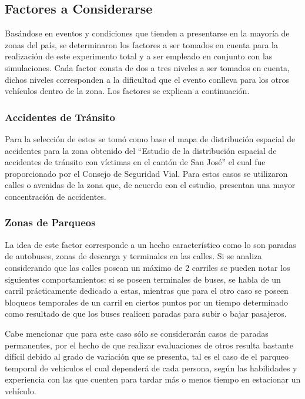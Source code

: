 \documentclass[12pt,journal,compsoc]{IEEEtran}
\begin{document}
\subsection{Factores a Considerarse}
Bas\'{a}ndose en eventos y condiciones que tienden a presentarse en la mayor\'{i}a de zonas del pa\'{i}s, se determinaron los factores a ser tomados en cuenta para la realizaci\'{o}n de este experimento total y a ser empleado en conjunto con las simulaciones. Cada factor consta de dos a tres niveles a ser tomados en cuenta, dichos niveles corresponden a la dificultad que el evento conlleva para los otros veh\'{i}culos dentro de la zona. Los factores se explican a continuaci\'{o}n.

\subsubsection{Accidentes de Tr\'{a}nsito}
Para la selecci\'{o}n de estos se tom\'{o} como base el mapa de distribuci\'{o}n espacial de accidentes para la zona obtenido del “Estudio de la distribuci\'{o}n espacial de accidentes de tr\'{a}nsito con v\'{i}ctimas en el cant\'{o}n de San Jos\'{e}” el cual fue proporcionado por el Consejo de Seguridad Vial. Para estos casos se utilizaron calles o avenidas de la zona que, de acuerdo con el estudio, presentan una mayor concentraci\'{o}n de accidentes.

\subsubsection{Zonas de Parqueos}
La idea de este  factor corresponde a un hecho caracter\'{i}stico como lo son paradas de autobuses, zonas de descarga y terminales en las calles. Si se analiza considerando que las calles posean un m\'{a}ximo de 2 carriles se pueden notar los siguientes comportamientos: si se poseen terminales de buses, se habla de un carril pr\'{a}cticamente dedicado a estas, mientras que para el otro caso se poseen bloqueos temporales de un carril en ciertos puntos por un tiempo determinado como resultado de que los buses realicen paradas para subir o bajar pasajeros. 

	Cabe mencionar que para este caso s\'{o}lo se considerar\'{a}n casos de paradas permanentes, por el hecho de que realizar evaluaciones de otros resulta bastante difícil debido al grado de variación que se presenta, tal es el caso de el parqueo temporal de vehículos el cual dependerá de cada persona, según las habilidades y experiencia con las que cuenten para tardar más o menos tiempo en estacionar un vehículo.
\end{document}
